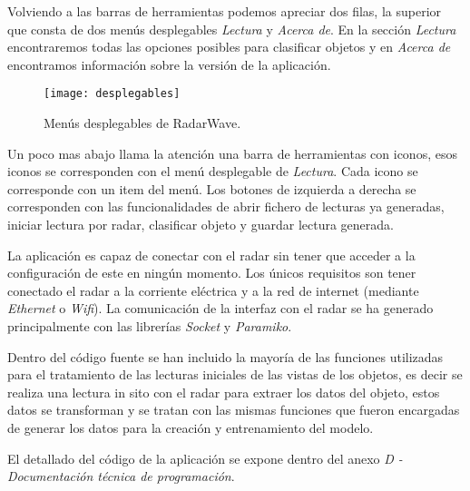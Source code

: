 Volviendo a las barras de herramientas podemos apreciar dos filas, la superior que consta de dos menús desplegables \textit{Lectura} y \textit{Acerca de}. En la sección \textit{Lectura} encontraremos todas las opciones posibles para clasificar objetos y en \textit{Acerca de} encontramos información sobre la versión de la aplicación.

\begin{figure}[h]
\begin{center}
	\texttt{[image: desplegables]}
	\caption{Menús desplegables de RadarWave.}
	\label{fig:desplegables}
\end{center}
\end{figure}

Un poco mas abajo llama la atención una barra de herramientas con iconos, esos iconos se corresponden con el menú desplegable de \textit{Lectura}. Cada icono se corresponde con un item del menú.
Los botones de izquierda a derecha se corresponden con las funcionalidades de abrir fichero de lecturas ya generadas, iniciar lectura por radar, clasificar objeto y guardar lectura generada.

La aplicación es capaz de conectar con el radar sin tener que acceder a la configuración de este en ningún momento. Los únicos requisitos son tener conectado el radar a la corriente eléctrica y a la red de internet (mediante \textit{Ethernet} o \textit{Wifi}). La comunicación de la interfaz con el radar se ha generado principalmente con las librerías \textit{Socket} y \textit{Paramiko}.

Dentro del código fuente se han incluido la mayoría de las funciones utilizadas para el tratamiento de las lecturas iniciales de las vistas de los objetos, es decir se realiza una lectura in sito con el radar para extraer los datos del objeto, estos datos se transforman y se tratan con las mismas funciones que fueron encargadas de generar los datos para la creación y entrenamiento del modelo.

El detallado del código de la aplicación se expone dentro del anexo \textit{D - Documentación técnica de programación}.

